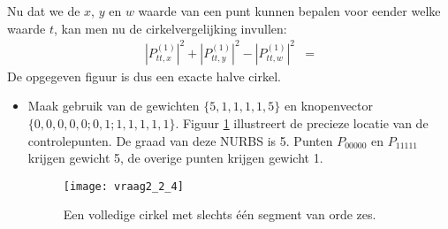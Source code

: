 \begin{enumerate}
{\begin{itemize}
			Nu dat we de $x$, $y$ en $w$ waarde van een punt kunnen bepalen voor eender welke waarde $t$, kan men nu de cirkelvergelijking invullen: 
			\begin{equation*}
				\begin{split}
					|P_{tt, x}^{(1)}|^2 + |P_{tt, y}^{(1)}|^2 - |P_{tt, w}^{(1)}|^2 & =
				\end{split}
			\end{equation*}
			De opgegeven figuur is dus een exacte halve cirkel.
		 \end{itemize}
		 }
			
	{
		\begin{itemize} 
			\item Maak gebruik van de gewichten $\{5, 1, 1, 1, 1, 5\}$ en knopenvector $\{0, 0, 0, 0, 0; 0, 1; 1,1,1,1,1\}$.  Figuur \ref{fig:vraag2_2_4} illustreert de precieze locatie van de controlepunten. De graad van deze NURBS is 5.  Punten $P_{00000}$ en $P_{11111}$ krijgen gewicht 5, de overige punten krijgen gewicht 1.
			\begin{figure}[ht]
				\centering
				\texttt{[image: vraag2\_2\_4]}
				\caption{Een volledige cirkel met slechts één segment van orde zes.}
				\label{fig:vraag2_2_4} 
			\end{figure}
		\end{itemize}}
\end{enumerate}

